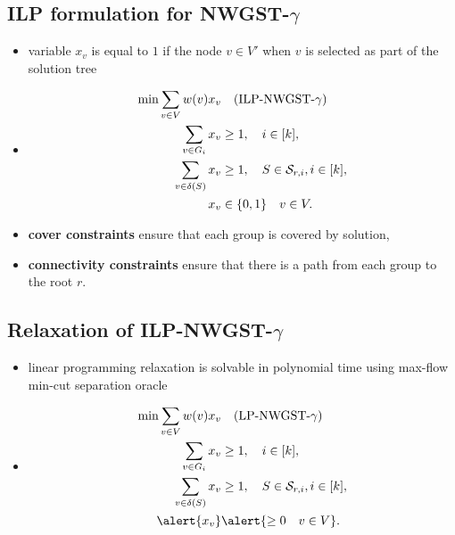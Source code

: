 \documentclass{beamer}
\begin{document}
\subsection*{ILP formulation for NWGST-$\gamma$}
\begin{frame}{\insertsection}{\insertsubsection}
    \begin{itemize}[<+->]
        \item variable $x_v$ is equal to $1$ if the node $v\in V'$ when $v$ is selected as part of the solution tree
        \item[]
        \begin{align*}
            \mbox{min} \sum_{v\in V}w(v)x_v&\quad\mbox{(ILP-NWGST-$\gamma$)}\notag\\
            \sum_{v\in G_i} x_v  &\geq 1,  \quad i\in[k],\\
            \sum_{v\in \delta(S)} x_v  &\geq 1, \quad S\in \mathcal{S}_{r,i}, i\in [k],\\
            x_v & \in \{0,1\} \quad v\in V.
        \end{align*}

        \item\textbf{cover constraints} ensure that each group is covered by solution,
        \item\textbf{connectivity constraints} ensure that there is a path from each group to the root $r$.
    \end{itemize}
\end{frame}

\subsection*{Relaxation of ILP-NWGST-$\gamma$}

\begin{frame}{\insertsection}{\insertsubsection}
    \begin{itemize}
        \item linear programming relaxation is solvable in polynomial time using max-flow min-cut separation oracle
        \item[]
        \begin{align*}
            \mbox{min} \sum_{v\in V}w(v)x_v&\quad\mbox{(LP-NWGST-$\gamma$)}\notag\\
            \sum_{v\in G_i} x_v  &\geq 1,  \quad i\in[k],\\
            \sum_{v\in \delta(S)} x_v  &\geq 1, \quad S\in \mathcal{S}_{r,i}, i\in [k],\\
            \alert{x_v} & \alert{\geq 0 \quad v\in V}.
        \end{align*}
    \end{itemize}
\end{frame}
\end{document}
